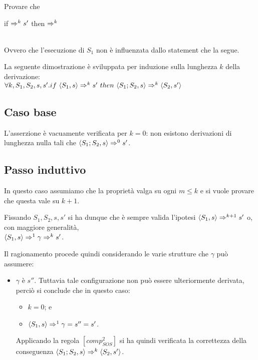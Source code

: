 {
  Provare che \\
  \centerline{if  $\Rightarrow^{k} s'$
  then  $\Rightarrow^{k}$ } \\
  Ovvero che l'esecuzione di $S_1$ non è influenzata dallo statement che la
  segue.
}
{
La seguente dimostrazione è sviluppata per induzione sulla lunghezza $k$ della
derivazione: \\

$\forall k,S_1,S_2,s,s'. if \mbox{ } \langle{}S_1, s\rangle{} \Rightarrow^{k} s' \mbox{ }
          then \mbox{ } \langle{}S_1; S_2, s\rangle{} \Rightarrow^{k} \langle{}S_2, s'\rangle{}$

\subsection{Caso base}

L'asserzione è vacuamente verificata per $k = 0$: non esistono derivazioni di
lunghezza nulla tali che $\langle{}S_1; S_2, s\rangle{} \Rightarrow^{0} s'$.

\subsection{Passo induttivo}

In questo caso assumiamo che la proprietà valga su ogni $m \leq k$ e si vuole
provare che questa vale su $k + 1$.

Fissando $S_1, S_2, s, s'$ si ha dunque che è sempre valida l'ipotesi
$\langle{}S_1, s\rangle{} \Rightarrow^{k+1} s'$ o, con maggiore generalità, \\
$\langle{}S_1, s\rangle{} \Rightarrow^{1} \gamma{} \Rightarrow^{k} s'$.

Il ragionamento procede quindi considerando le varie strutture che $\gamma$ può
assumere:

\begin{itemize}
\item $\gamma$ è $s''$. Tuttavia tale configurazione non può essere
  ulteriormente derivata, perciò si conclude che in questo caso:
  \begin{itemize}
    \item $k = 0$; e
    \item $\langle{}S_1, s\rangle{} \Rightarrow^{1} \gamma{} = s'' = s'$.
  \end{itemize}

  Applicando la regola $[comp^2_{SOS}]$ si ha quindi verificata la correttezza
  della conseguenza $\langle{}S_1; S_2, s\rangle{} \Rightarrow^{k} \langle{}S_2, s'\rangle{}$.


\end{itemize}}

